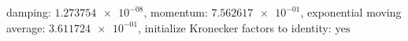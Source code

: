 damping: $\num[scientific-notation=true]{1.273754e-08}$, momentum: $\num[scientific-notation=true]{7.562617e-01}$, exponential moving average: $\num[scientific-notation=true]{3.611724e-01}$, initialize Kronecker factors to identity: $\text{yes}$